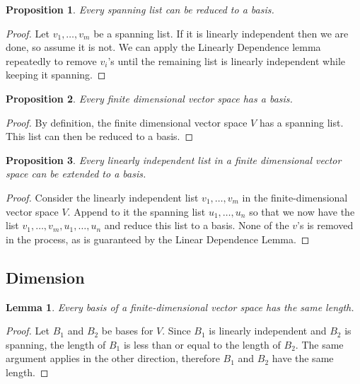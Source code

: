 \documentclass{article}
\newtheorem{lemma}{Lemma}[subsection]
\newtheorem{proposition}{Proposition}[subsection]
\theoremstyle{definition}
\theoremstyle{remark}
\begin{document}
\begin{proposition}
   Every spanning list can be reduced to a basis.
\end{proposition}

\begin{proof}
    Let $v_1, \dots, v_m$ be a spanning list. If it is linearly independent then we are done, so assume it is not. We can apply the Linearly Dependence lemma repeatedly to remove $v_i$'s until the remaining list is linearly independent while keeping it spanning.
\end{proof}

\begin{proposition}
   Every finite dimensional vector space has a basis.
\end{proposition}

\begin{proof}
    By definition, the finite dimensional vector space $V$ has a spanning list. This list can then be reduced to a basis.
\end{proof}

\begin{proposition}
   Every linearly independent list in a finite dimensional vector space can be extended to a basis.
\end{proposition}

\begin{proof}
    Consider the linearly independent list $v_1, \dots, v_m$ in the finite-dimensional vector space $V$. Append to it the spanning list $u_1, \dots, u_n$ so that we now have the list $v_1, \dots, v_m, u_1, \dots, u_n$ and reduce this list to a basis. None of the $v$'s is removed in the process, as is guaranteed by the Linear Dependence Lemma.
\end{proof}

\subsection{Dimension}

\begin{lemma}
    Every basis of a finite-dimensional vector space has the same length.
\end{lemma}

\begin{proof}
    Let $B_1$ and $B_2$ be bases for $V$. Since $B_1$ is linearly independent and $B_2$ is spanning, the length of $B_1$ is less than or equal to the length of $B_2$. The same argument applies in the other direction, therefore $B_1$ and $B_2$ have the same length.
\end{proof}
\end{document}
